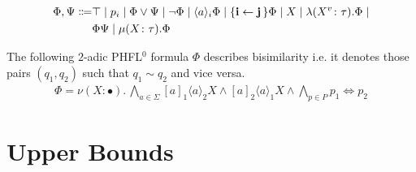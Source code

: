\begin{frame}

    \begin{definition}
        \begin{align*}
            \Phi,\Psi\Coloneqq&\top \mid p_i \mid \Phi \vee \Psi \mid \neg \Phi \mid \langle a \rangle_i \Phi \mid
            \{\emph{i}
            \leftarrow \emph{j}\,\} \Phi \mid X \mid \lambda (X^v\colon\tau).\Phi \mid \\&\Phi \Psi\mid
            \mu (X\colon\tau).\Phi
        \end{align*}
    \end{definition}

\end{frame}

\begin{frame}
\begin{example}
\label{example:phfl_order_0}
The following $2$-adic PHFL$^0$ formula $\Phi$ describes bisimilarity i.e. it denotes
those pairs $(q_1, q_2)$ such that $q_1 \sim q_2$ and vice versa.
\begin{align*}
\Phi = \nu (X \colon \bullet).\,
\underset{a \in \Sigma}{\bigwedge} [a]_1 \langle a \rangle_2 X \wedge [a]_2 \langle a \rangle_1 X \wedge
\underset{p \in P}{\bigwedge} p_1 \Leftrightarrow p_2
\end{align*}
\end{example}
\end{frame}

\section{Upper Bounds}

\begin{frame}
\begin{example}
\begin{center}
\end{center}
\end{example}
\end{frame}


